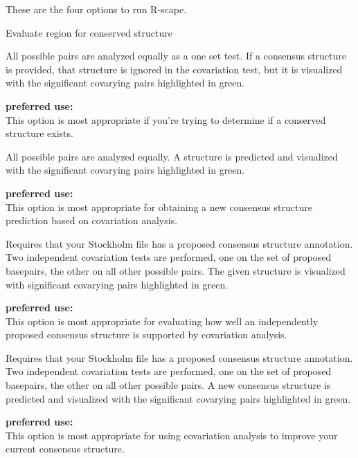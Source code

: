These are the four options to run R-scape.

\begin{labeling}{Evaluate region for conserved structure}
  
\item[Evaluate region for conserved structure]

  All possible pairs are analyzed equally as a one set test.  If a
  consensus structure is provided, that structure is ignored in the
  covariation test, but it is visualized with the significant
  covarying pairs highlighted in green.

  \textbf{preferred use:}\\
  This option is most appropriate if you're trying to determine if a conserved structure exists.\\
  
\item[Predict new structure]

  All possible pairs are analyzed equally.
  A structure is predicted and visualized with the significant covarying pairs highlighted in green.

  \textbf{preferred use:}\\
  This option is most appropriate for obtaining a new consensus
  structure prediction based on covariation analysis.

\item[Evaluate given structure]
  
  Requires that your Stockholm file has a proposed consensus structure annotation.
  Two independent covariation tests are performed, one on the set of proposed basepairs, the other on all other possible pairs.
  The given structure is visualized with significant covarying pairs highlighted in green.

  \textbf{preferred use:}\\
  This option is most appropriate for evaluating how well an
  independently proposed consensus structure is supported by
  covariation analysis.


\item[Improve given structure]

  Requires that your Stockholm file has a proposed consensus structure annotation.
  Two independent covariation tests are performed, one on the set of proposed basepairs, the other on all other possible pairs.
  A new consensus structure is predicted and visualized with the significant covarying pairs highlighted in green.

  \textbf{preferred use:}\\
  This option is most appropriate for using covariation analysis to improve your current consensus structure.

\end{labeling}



